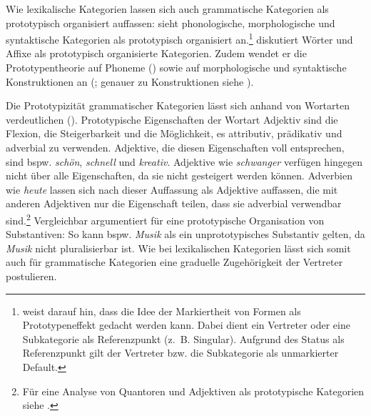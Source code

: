 Wie lexikalische Kategorien lassen sich auch grammatische Kategorien als prototypisch organisiert auffassen: \textcite[59--67]{Lakoff.1987} sieht phonologische, morphologische und syntaktische Kategorien als prototypisch organisiert an.\footnote{\textcite[59--61]{Lakoff.1987} weist darauf hin, dass die Idee der Markiertheit von Formen als Prototypeneffekt gedacht werden kann. Dabei dient ein Vertreter oder eine Subkategorie als Referenzpunkt (z.~B. Singular). Aufgrund des Status als Referenzpunkt gilt der Vertreter bzw. die Subkategorie als unmarkierter Default.} \textcite[175--182]{Taylor.1995} diskutiert Wörter und Affixe als prototypisch organisierte Kategorien. Zudem wendet er die Prototypentheorie auf Phoneme (\cite[223--229]{Taylor.1995}) sowie auf morphologische und syntaktische Konstruktionen an  (\cites[192--198]{Taylor.1998}[570--575]{Taylor.2015}; genauer zu Konstruktionen siehe ).

Die Prototypizität grammatischer Kategorien lässt sich anhand von Wortarten verdeutlichen (\cites[181--184]{Taylor.1998}[8--9]{Hundt.2000}). Prototypische Eigenschaften der Wortart Adjektiv sind die Flexion, die Steigerbarkeit und die Möglichkeit, es attributiv, prädikativ und adverbial zu verwenden. Adjektive, die diesen Eigenschaften voll entsprechen, sind bspw. \textit{schön}, \textit{schnell} und \textit{kreativ}. Adjektive wie \textit{schwanger} verfügen hingegen nicht über alle Eigenschaften, da sie nicht gesteigert werden können. Adverbien wie \textit{heute} lassen sich nach dieser Auffassung als Adjektive auffassen, die mit anderen Adjektiven nur die Eigenschaft teilen, dass sie adverbial verwendbar sind.\footnote{Für eine Analyse von Quantoren und Adjektiven als prototypische Kategorien siehe \textcite{Hundt.2000}.} Vergleichbar argumentiert \textcite[569--570]{Taylor.2015} für eine prototypische Organisation von Substantiven: So kann bspw. \textit{Musik} als ein unprototypisches Substantiv gelten, da \textit{Musik} nicht pluralisierbar ist. Wie bei lexikalischen Kategorien lässt sich somit auch für grammatische Kategorien eine graduelle Zugehörigkeit der Vertreter postulieren.

